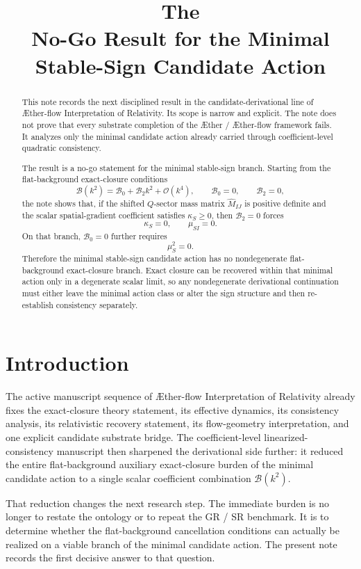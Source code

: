 \documentclass[11pt]{article}
\title{\textbf{The \TheoryName{}}\\[0.4em]
\large No-Go Result for the Minimal Stable-Sign Candidate Action}
\author{}
\date{}
\newcommand{\Aether}{\AE{}ther}
\newcommand{\Aflow}{\AE{}ther-flow}
\newcommand{\TheoryName}{\Aflow{} Interpretation of Relativity}
\begin{document}
\maketitle

\begin{abstract}
This note records the next disciplined result in the candidate-derivational line of \TheoryName{}. Its scope is narrow and explicit. The note does not prove that every substrate completion of the \Aether{} / \Aflow{} framework fails. It analyzes only the minimal candidate action already carried through coefficient-level quadratic consistency.

The result is a no-go statement for the minimal stable-sign branch. Starting from the flat-background exact-closure conditions
\[
\mathcal B(k^2)=\mathcal B_0+\mathcal B_2k^2+\mathcal O(k^4),
\qquad
\mathcal B_0=0,
\qquad
\mathcal B_2=0,
\]
the note shows that, if the shifted \(Q\)-sector mass matrix \(\widehat M_{IJ}\) is positive definite and the scalar spatial-gradient coefficient satisfies \(\kappa_S\ge 0\), then \(\mathcal B_2=0\) forces
\[
\kappa_S=0,
\qquad
\mu_{SI}=0.
\]
On that branch, \(\mathcal B_0=0\) further requires
\[
\mu_S^2=0.
\]
Therefore the minimal stable-sign candidate action has no nondegenerate flat-background exact-closure branch. Exact closure can be recovered within that minimal action only in a degenerate scalar limit, so any nondegenerate derivational continuation must either leave the minimal action class or alter the sign structure and then re-establish consistency separately.
\end{abstract}

\section{Introduction}

The active manuscript sequence of \TheoryName{} already fixes the exact-closure theory statement, its effective dynamics, its consistency analysis, its relativistic recovery statement, its flow-geometry interpretation, and one explicit candidate substrate bridge. The coefficient-level linearized-consistency manuscript then sharpened the derivational side further: it reduced the entire flat-background auxiliary exact-closure burden of the minimal candidate action to a single scalar coefficient combination \(\mathcal B(k^2)\).

That reduction changes the next research step. The immediate burden is no longer to restate the ontology or to repeat the GR / SR benchmark. It is to determine whether the flat-background cancellation conditions can actually be realized on a viable branch of the minimal candidate action. The present note records the first decisive answer to that question.
\end{document}

